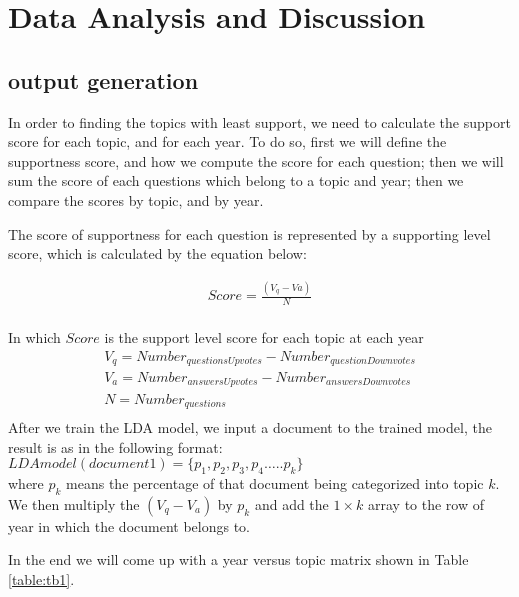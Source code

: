 \section{Data Analysis and Discussion}

\subsection{output generation}

In order to finding the topics with least support, we need to calculate the support score for each topic, and for each year. To do so, first we will define the supportness score, and how we compute the score for each question; then we will sum the score of each questions which belong to a topic and year; then we compare the scores by topic, and by year.

The score of supportness for each question is represented by a supporting level score, which is calculated by the equation below:

\begin{gather*}
Score = \frac{(V_{q} - V{a})}{N}\\
\end{gather*}

In which $Score$ is the support level score for each topic at each year
\begin{gather*}
V_{q} = Number_{questionsUpvotes} - Number_{questionDownvotes}\\
V_{a} = Number_{answersUpvotes} - Number_{answersDownvotes} \\
N = Number_{questions}\\
\end{gather*}
After we train the LDA model, we input a document to the trained model, the result is as in the following format:\\

$LDAmodel (document 1) = \{p_{1}, p_{2}, p_{3}, p_{4}…..p_{k}\}$\\


where $p_{k}$ means the percentage of that document being categorized into topic $k$. We then multiply the $(V_{q} - V_{a})$ by $p_{k}$ and add the $1\times k$ array to the row of year in which the document belongs to.

In the end we will come up with a year versus topic matrix shown in Table \ref{table:tb1}.

